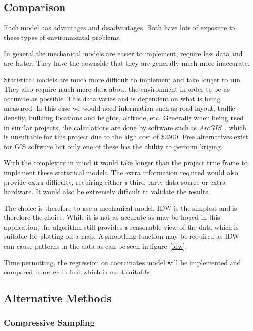 \subsection{Comparison}\label{interpolationcomparison}

Each model has advantages and disadvantages. Both have lots of exposure to these types of environmental problems. 

In general the mechanical models are easier to implement, require less data and are faster. They have the downside that they are generally much more inaccurate. 

Statistical models are much more difficult to implement and take longer to run. They also require much more data about the environment in order to be as accurate as possible. This data varies and is dependent on what is being measured. In this case we would need information such as road layout, traffic density, building locations and heights, altitude, etc. Generally when being used in similar projects, the calculations are done by software such as \emph{ArcGIS}~\cite{arcgis}, which is unsuitable for this project due to the high cost of \$2500. Free alternatives exist for GIS software but only one of these has the ability to perform kriging. 

With the complexity in mind it would take longer than the project time frame to implement these statistical models. The extra information required would also provide extra difficulty, requiring either a third party data source or extra hardware. It would also be extremely difficult to validate the results. 

The choice is therefore to use a mechanical model. IDW is the simplest and is therefore the choice. While it is not as accurate as may be hoped in this application, the algorithm still provides a reasonable view of the data which is suitable for plotting on a map. A smoothing function may be required as IDW can cause patterns in the data as can be seen in figure~\ref{idw}.

Time permitting, the regression on coordinates model will be implemented and compared in order to find which is most suitable. 

\subsection{Alternative Methods}\label{interpolationalternatives}

\subsubsection{Compressive Sampling}\label{compressivesampling} 


